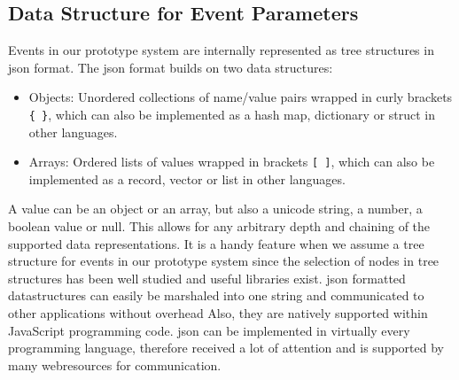 \subsection{Data Structure for Event Parameters}
Events in our prototype system are internally represented as tree structures in \textrm{\acrshort{json}} format.
The \textrm{\acrshort{json}} format builds on two data structures:
\begin{itemize}
	\item Objects: Unordered collections of name/value pairs wrapped in curly brackets \texttt{\{ \}}, which can also be implemented as a hash map, dictionary or struct in other languages.
	\item Arrays: Ordered lists of values wrapped in brackets \texttt{[ ]}, which can also be implemented as a record, vector or list in other languages.
\end{itemize}
A value can be an object or an array, but also a unicode string, a number, a boolean value or null.
This allows for any arbitrary depth and chaining of the supported data representations.
It is a handy feature when we assume a tree structure for events in our prototype system since the selection of nodes in tree structures has been well studied and useful libraries exist.
\textrm{\acrshort{json}} formatted datastructures can easily be marshaled into one string and communicated to other applications without overhead
Also, they are natively supported within \textrm{JavaScript} programming code. 
\textrm{\acrshort{json}} can be implemented in virtually every programming language, therefore received a lot of attention and is supported by many \textrm{\glspl{webresource}} for communication.



